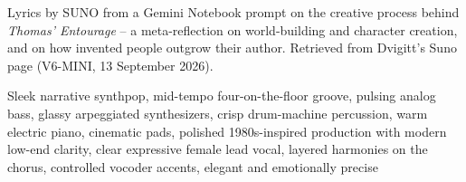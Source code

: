 
\begin{notes}
Lyrics by SUNO from a Gemini Notebook prompt on the creative process behind \emph{Thomas' Entourage} -- a meta-reflection on world-building and character creation, and on how invented people outgrow their author. Retrieved from Dvigitt's Suno page (V6-MINI, 13 September 2026).
\end{notes}
\begin{style}
Sleek narrative synthpop, mid-tempo four-on-the-floor groove, pulsing analog bass, glassy arpeggiated synthesizers, crisp drum-machine percussion, warm electric piano, cinematic pads, polished 1980s-inspired production with modern low-end clarity, clear expressive female lead vocal, layered harmonies on the chorus, controlled vocoder accents, elegant and emotionally precise
\end{style}
